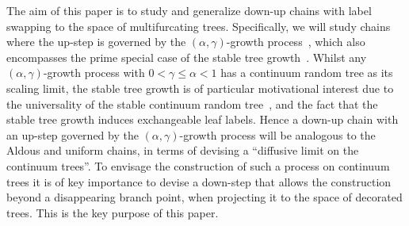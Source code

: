 \documentclass[a4paper, final]{amsart}
\theoremstyle{plain}
\theoremstyle{definition}
\begin{document}
The aim of this paper is to study and generalize down-up chains with label swapping to the space of multifurcating trees.
Specifically, we will study chains where the up-step is governed by the $(\alpha, \gamma)$-growth process~\cite{RefWorks:doc:5b4cbb5fe4b02dc0c79270af}, which also encompasses the prime special case of the stable tree growth~\cite{RefWorks:doc:5b6c561fe4b06c0731a5c558}.
Whilst any $(\alpha, \gamma)$-growth process with $0 < \gamma \leq \alpha < 1$ has a continuum random tree as its scaling limit, the stable tree growth is of particular motivational interest due to the universality of the stable continuum random tree~\cite{RefWorks:doc:5b6c561fe4b06c0731a5c558}, and the fact that the stable tree growth induces exchangeable leaf labels.
Hence a down-up chain with an up-step governed by the $(\alpha, \gamma)$-growth process will be analogous to the Aldous and uniform chains, in terms of devising a “diffusive limit on the continuum trees”.
To envisage the construction of such a process on continuum trees it is of key importance to devise a down-step that allows the construction beyond a disappearing branch point, when projecting it to the space of decorated trees.
This is the key purpose of this paper.
\end{document}
